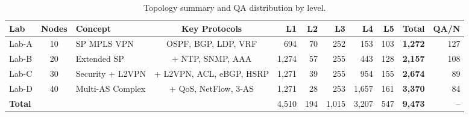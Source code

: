 \begin{table}[!t]
  \caption{Topology summary and QA distribution by level. }
  \label{tab:topology-summary}
  \centering
  \small
  \begin{tabular}{lclcrrrrrrr}
    \toprule
    \textbf{Lab} & \textbf{Nodes} & \textbf{Concept} & \textbf{Key Protocols} & \textbf{L1} & \textbf{L2} & \textbf{L3} & \textbf{L4} & \textbf{L5} & \textbf{Total} & \textbf{QA/N} \\
    \midrule
    Lab-A & 10 & SP MPLS VPN      & OSPF, BGP, LDP, VRF       & 694   & 70  & 252 & 153   & 103 & \textbf{1,272} & 127 \\
    Lab-B & 20 & Extended SP      & + NTP, SNMP, AAA           & 1,274 & 57  & 255 & 443   & 128 & \textbf{2,157} & 108 \\
    Lab-C & 30 & Security + L2VPN & + L2VPN, ACL, eBGP, HSRP   & 1,271 & 39  & 255 & 954   & 155 & \textbf{2,674} & 89  \\
    Lab-D & 40 & Multi-AS Complex & + QoS, NetFlow, 3-AS       & 1,271 & 28  & 253 & 1,657 & 161 & \textbf{3,370} & 84  \\
    \midrule
    \multicolumn{4}{l}{\textbf{Total}} & 4,510 & 194 & 1,015 & 3,207 & 547 & \textbf{9,473} & --  \\
    \bottomrule
  \end{tabular}
\end{table}